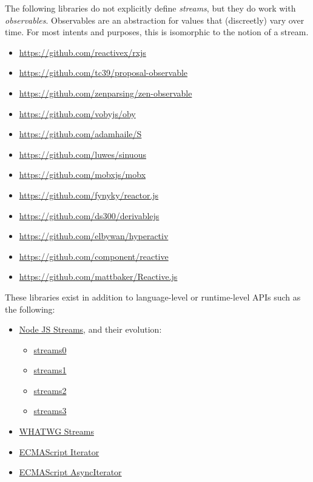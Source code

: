 \documentclass[sigplan,screen,10pt,anonymous,review]{acmart}
\begin{document}
The following libraries do not explicitly define \textit{streams}, but they do work with \textit{observables}. Observables are an abstraction for values that (discreetly) vary over time. For most intents and purposes, this is isomorphic to the notion of a stream.

\begin{itemize}
    \item \url{https://github.com/reactivex/rxjs}
    \item \url{https://github.com/tc39/proposal-observable}
    \item \url{https://github.com/zenparsing/zen-observable}
    \item \url{https://github.com/vobyjs/oby}
    \item \url{https://github.com/adamhaile/S}
    \item \url{https://github.com/luwes/sinuous}
    \item \url{https://github.com/mobxjs/mobx}
    \item \url{https://github.com/fynyky/reactor.js}
    \item \url{https://github.com/ds300/derivablejs}
    \item \url{https://github.com/elbywan/hyperactiv}
    \item \url{https://github.com/component/reactive}
    \item \url{https://github.com/mattbaker/Reactive.js}
\end{itemize}

These libraries exist in addition to language-level or runtime-level APIs such as the following:

\begin{itemize}
    \item \href{https://nodejs.org/api/stream.html}{Node JS Streams}, and their evolution: \begin{itemize}
        \item \href{https://nodejs.org/docs/v0.1.100/api.html}{streams0}
        \item \href{https://nodejs.org/docs/v0.4.0/api/streams.html}{streams1}
        \item \href{https://nodejs.org/docs/v0.10.0/api/stream.html}{streams2}
        \item \href{https://nodejs.org/docs/v0.11.5/api/stream.html}{streams3}
    \end{itemize}
    \item \href{https://streams.spec.whatwg.org/}{WHATWG Streams}
    \item \href{https://tc39.es/ecma262/multipage/control-abstraction-objects.html#sec-%iteratorprototype%-object}{ECMAScript Iterator}
    \item \href{https://tc39.es/ecma262/multipage/control-abstraction-objects.html#sec-asynciteratorprototype}{ECMAScript AsyncIterator}
\end{itemize}



\end{document}
